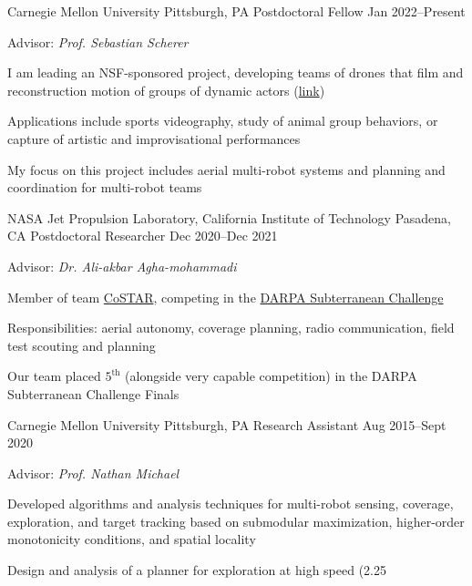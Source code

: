 
\begin{cventries}
  \cventry
  {Carnegie Mellon University}
  {Pittsburgh, PA}
  {Postdoctoral Fellow}
  {Jan 2022--Present}
  {
    Advisor: \emph{Prof. Sebastian Scherer}\linebreak
    \begin{cvitems}
    \item I am leading an NSF-sponsored project, developing teams of drones that
      film and reconstruction motion of groups of dynamic actors
      (\href{https://theairlab.org/multidrone/}{link})
    \item Applications include sports videography, study of animal
      group behaviors, or capture of artistic and improvisational performances
    \item My focus on this project includes aerial multi-robot systems and
      planning and coordination for multi-robot teams
    \end{cvitems}
  }
  \cventry
  {NASA Jet Propulsion Laboratory, California Institute of Technology}
  {Pasadena, CA}
  {Postdoctoral Researcher}
  {Dec 2020--Dec 2021}
  {
    Advisor: \emph{Dr. Ali-akbar Agha-mohammadi}\linebreak
    \begin{cvitems}
    \item Member of team \href{https://costar.jpl.nasa.gov/}{CoSTAR}, competing in the
      \href{https://www.subtchallenge.com/}{DARPA Subterranean Challenge}
    \item Responsibilities:
      aerial autonomy, coverage planning, radio communication,
      field test scouting and planning
    \item Our team placed $5^\mathrm{th}$ (alongside very capable competition)
      in the DARPA Subterranean Challenge Finals
    \end{cvitems}
  }
  \cventry
  {Carnegie Mellon University}
  {Pittsburgh, PA}
  {Research Assistant}
  {Aug 2015--Sept 2020}
  {
    Advisor: \emph{Prof. Nathan Michael}\linebreak
    \begin{cvitems} %
    \item Developed algorithms and analysis techniques for multi-robot sensing,
      coverage, exploration, and target tracking based on submodular
      maximization, higher-order monotonicity conditions, and spatial locality
    \item Design and analysis of a planner for exploration at high speed (2.25

\end{cvitems}}
\end{cventries}
